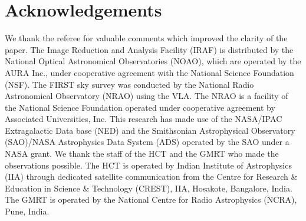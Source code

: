 \documentclass[useAMS,usenatbib]{mn2e}
\begin{document}

\section*{Acknowledgements}
We thank the referee for valuable comments which improved the clarity of the paper. The Image Reduction and Analysis Facility {\small (IRAF)} is distributed by the National Optical Astronomical Observatories (NOAO), which are operated by the AURA Inc., under cooperative agreement with the National Science Foundation (NSF). The FIRST sky survey was conducted by the National Radio Astronomical Observatory (NRAO) using the VLA. The NRAO is a facility of the National Science Foundation operated under cooperative agreement by Associated Universities, Inc. This research has made use of the NASA/IPAC Extragalactic Data base (NED) and the Smithsonian Astrophysical Observatory (SAO)/NASA Astrophysics Data System (ADS) operated by the SAO under a NASA grant. We thank the staff of the HCT and the GMRT who made the observations possible. The HCT is operated by Indian Institute of Astrophysics (IIA) through dedicated satellite communication from the Centre for Research \& Education in Science \& Technology (CREST), IIA, Hosakote, Bangalore, India. The GMRT is operated by the National Centre for Radio Astrophysics (NCRA), Pune, India.




\bsp	%
\label{lastpage}
\end{document}
